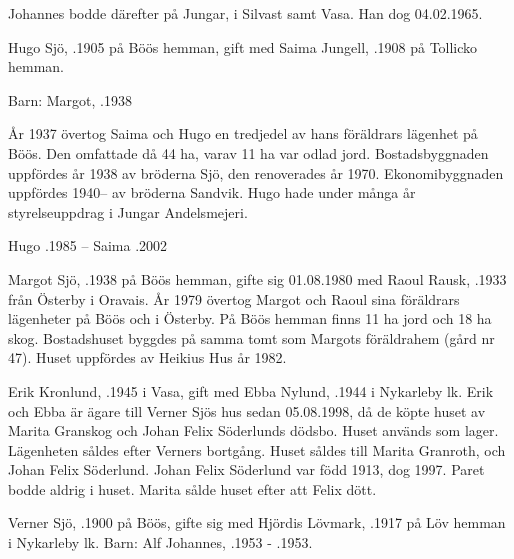 Johannes bodde därefter på Jungar, i Silvast samt Vasa. Han dog 04.02.1965.




Hugo Sjö, .1905 på Böös hemman, gift med Saima Jungell, .1908 på Tollicko hemman.

Barn: Margot, .1938


År 1937 övertog Saima och Hugo en tredjedel av hans föräldrars lägenhet på Böös. Den omfattade då 44 ha, varav 11 ha var odlad jord. Bostadsbyggnaden uppfördes år 1938 av bröderna Sjö, den renoverades år 1970. Ekonomibyggnaden uppfördes 1940-- av bröderna Sandvik. Hugo hade under många år styrelseuppdrag i Jungar Andelsmejeri.

Hugo .1985  --  Saima .2002



Margot Sjö, .1938 på Böös hemman, gifte sig 01.08.1980 med Raoul Rausk, .1933 från Österby i Oravais. År 1979 övertog Margot och Raoul sina föräldrars lägenheter på Böös och i Österby. På Böös hemman finns 11 ha jord och 18 ha skog. Bostadshuset byggdes på samma tomt som Margots föräldrahem (gård nr 47). Huset uppfördes av Heikius Hus år 1982.




Erik Kronlund, .1945 i Vasa, gift med Ebba Nylund, .1944 i Nykarleby lk. Erik och Ebba är ägare till Verner Sjös hus sedan 05.08.1998, då de köpte huset av Marita Granskog och Johan Felix Söderlunds dödsbo. Huset används som lager.
Lägenheten såldes efter Verners bortgång. Huset såldes till Marita Granroth,  och Johan Felix Söderlund. Johan Felix Söderlund var född 1913, dog 1997. Paret bodde aldrig i huset. Marita sålde huset efter att Felix dött.

Verner Sjö,  .1900 på Böös, gifte sig med Hjördis Lövmark, .1917 på Löv hemman i Nykarleby lk. Barn: Alf Johannes, .1953 - .1953.

